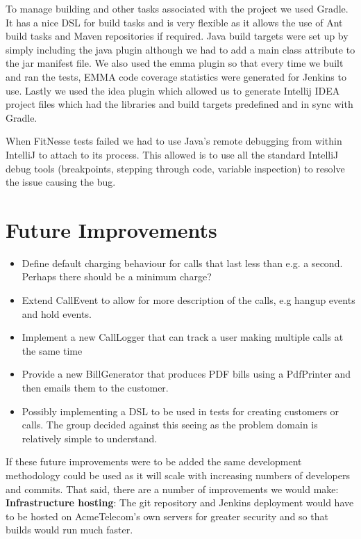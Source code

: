 \documentclass[a4paper,11pt]{article}
\begin{document}
To manage building and other tasks associated with the project we used Gradle. It has a nice DSL for build tasks and is very flexible as it allows the use of Ant build tasks and Maven repositories if required. Java build targets were set up by simply including the java plugin although we had to add a main class attribute to the jar manifest file. We also used the emma plugin so that every time we built and ran the tests, EMMA code coverage statistics were generated for Jenkins to use. Lastly we used the idea plugin which allowed us to generate Intellij IDEA project files which had the libraries and build targets predefined and in sync with Gradle.

When FitNesse tests failed we had to use Java's remote debugging from within IntelliJ to attach to its process. This allowed is to use all the standard IntelliJ debug tools (breakpoints, stepping through code, variable inspection) to resolve the issue causing the bug.

\pagebreak

\section{Future Improvements}

\begin{itemize}
\item Define default charging behaviour for calls that last less than e.g. a second. Perhaps there should be a minimum charge?
\item Extend CallEvent to allow for more description of the calls, e.g hangup events and hold events.
\item Implement a new CallLogger that can track a user making multiple calls at the same time
\item Provide a new BillGenerator that produces PDF bills using a PdfPrinter and then emails them to the customer.
\item Possibly implementing a DSL to be used in tests for creating customers or calls. The group decided against this seeing as the problem domain is relatively simple to understand.
\end{itemize}

If these future improvements were to be added the same development methodology could be used as it will scale with increasing numbers of developers and commits. That said, there are a number of improvements we would make:
\\

\textbf{Infrastructure hosting}: The git repository and Jenkins deployment would have to be hosted on AcmeTelecom's own servers for greater security and so that builds would run much faster.
\end{document}
